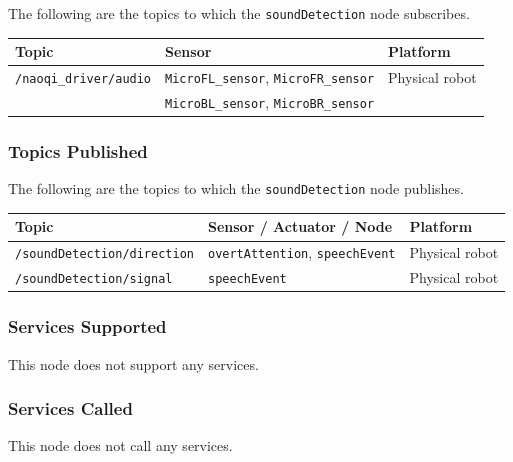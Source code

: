 \documentclass{CSSRforAfrica}
\begin{document}
{{The following are the topics to which the {\small \verb+soundDetection+} node subscribes.

\begin{center}
\begin{tabularx}{\linewidth}{| l | l | X|}
\hline 
{\small Topic }                               & {\small Sensor }                            &  {\small Platform}       \\
\hline
{\footnotesize \verb+/naoqi_driver/audio+ }  & {\footnotesize \verb+MicroFL_sensor+}, {\footnotesize \verb+MicroFR_sensor+}      & {\small Physical robot } \\ 
                                                                        & {\footnotesize \verb+MicroBL_sensor+}, {\footnotesize \verb+MicroBR_sensor+}      &  \\ 
\hline
\end{tabularx}
\end{center}


\subsubsection*{Topics Published}

The following are the topics to which the {\small \verb+soundDetection+} node publishes.
 
\begin{center}
\begin{tabularx}{\linewidth}{| l | l | X|}
\hline 
{\small Topic }                                                                                & {\small Sensor / Actuator / Node}    &  {\small Platform}       \\
\hline
{\footnotesize \verb+/soundDetection/direction+ }  & {\footnotesize \verb+overtAttention+, \verb+speechEvent+ } & {\small Physical robot} \\ 
\hline
{\footnotesize \verb+/soundDetection/signal+ }  & {\footnotesize \verb+speechEvent+  } & {\small Physical robot} \\ 
\hline
\end{tabularx}
\end{center}

\subsubsection*{Services Supported}
This node  does not support any services.

\subsubsection*{Services Called}
This node does not call any services.








}}
\end{document}

